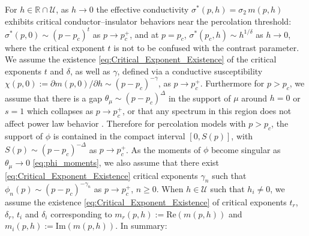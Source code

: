 \documentclass[english,12pt,jmp,graphicx]{revtex4-1}
\begin{document}
For $h\in\mathbb{R}\cap\mathcal{U}$, as $h\to0$ the effective conductivity
$\sigma^*(p,h)=\sigma_2\,m(p,h)$ exhibits
critical conductor--insulator behaviors near the percolation threshold:
$\sigma^*(p,0)\sim(p-p_c)^t$ as $p\to p_c^+$, and at $p=p_c$,
$\sigma^*(p_c,h)\sim h^{1/\delta}$ as $h\to0$, where the critical exponent $t$ is not
to be confused with the contrast parameter. We assume the existence
\eqref{eq:Critical_Exponent_Existence} of the
critical exponents $t$ and $\delta$, as well as $\gamma$, defined via a
conductive susceptibility $\chi(p,0):=\partial m(p,0)/\partial h\sim(p-p_c)^{-\gamma}$, as
$p\to p_c^+$. Furthermore for $p>p_c$, we assume that there is a gap 
$\theta_\mu\sim(p-p_c)^\Delta$ in the support of $\mu$ around $h=0$ or $s=1$ which
collapses as $p\to p_c^+$, or that any spectrum in this region does not
affect power law behavior \cite{Golden:PRL-3935}. Therefore for 
percolation models with $p>p_c$, the support of $\phi$ is contained in
the compact interval $[0,S(p)]$, with $S(p)\sim(p-p_c)^{-\Delta}$ as
$p\to p_c^+$. As the moments of $\phi$ become singular as $\theta_\mu\to0$ 
\eqref{eq:phi_moments}, we also assume that there exist
\eqref{eq:Critical_Exponent_Existence} critical
exponents $\gamma_n$ such that $\phi_n(p)\sim(p-p_c)^{-\gamma_n}$ as $p\to p_c^+$,
$n\geq0$. When $h\in\mathcal{U}$ such that $h_i\neq0$, we
assume the existence \eqref{eq:Critical_Exponent_Existence} of
critical exponents $t_r$, $\delta_r$, $t_i$ and $\delta_i$ corresponding to
$m_r(p,h):=\text{Re}(m(p,h))$ and $m_i(p,h):=\text{Im}(m(p,h))$.
In summary:  
\end{document}
